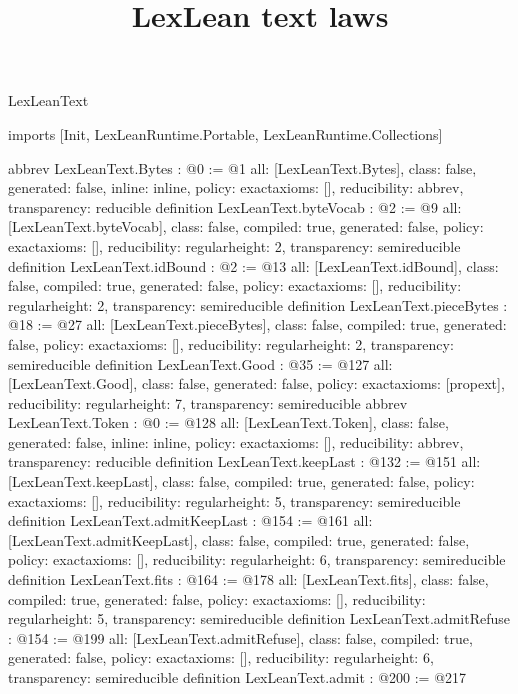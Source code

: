 \begin{lexlean}{LexLeanText}
\title{LexLean text laws}
\begin{coremodule}
imports [Init, LexLeanRuntime.Portable, LexLeanRuntime.Collections]

abbrev LexLeanText.Bytes : @0 := @1 {
  all: [LexLeanText.Bytes],
  class: false,
  generated: false,
  inline: inline,
  policy: exact{axioms: []},
  reducibility: abbrev{},
  transparency: reducible
}
definition LexLeanText.byteVocab : @2 := @9 {
  all: [LexLeanText.byteVocab],
  class: false,
  compiled: true,
  generated: false,
  policy: exact{axioms: []},
  reducibility: regular{height: 2},
  transparency: semireducible
}
definition LexLeanText.idBound : @2 := @13 {
  all: [LexLeanText.idBound],
  class: false,
  compiled: true,
  generated: false,
  policy: exact{axioms: []},
  reducibility: regular{height: 2},
  transparency: semireducible
}
definition LexLeanText.pieceBytes : @18 := @27 {
  all: [LexLeanText.pieceBytes],
  class: false,
  compiled: true,
  generated: false,
  policy: exact{axioms: []},
  reducibility: regular{height: 2},
  transparency: semireducible
}
definition LexLeanText.Good : @35 := @127 {
  all: [LexLeanText.Good],
  class: false,
  generated: false,
  policy: exact{axioms: [propext]},
  reducibility: regular{height: 7},
  transparency: semireducible
}
abbrev LexLeanText.Token : @0 := @128 {
  all: [LexLeanText.Token],
  class: false,
  generated: false,
  inline: inline,
  policy: exact{axioms: []},
  reducibility: abbrev{},
  transparency: reducible
}
definition LexLeanText.keepLast : @132 := @151 {
  all: [LexLeanText.keepLast],
  class: false,
  compiled: true,
  generated: false,
  policy: exact{axioms: []},
  reducibility: regular{height: 5},
  transparency: semireducible
}
definition LexLeanText.admitKeepLast : @154 := @161 {
  all: [LexLeanText.admitKeepLast],
  class: false,
  compiled: true,
  generated: false,
  policy: exact{axioms: []},
  reducibility: regular{height: 6},
  transparency: semireducible
}
definition LexLeanText.fits : @164 := @178 {
  all: [LexLeanText.fits],
  class: false,
  compiled: true,
  generated: false,
  policy: exact{axioms: []},
  reducibility: regular{height: 5},
  transparency: semireducible
}
definition LexLeanText.admitRefuse : @154 := @199 {
  all: [LexLeanText.admitRefuse],
  class: false,
  compiled: true,
  generated: false,
  policy: exact{axioms: []},
  reducibility: regular{height: 6},
  transparency: semireducible
}
definition LexLeanText.admit : @200 := @217 {
}
\end{coremodule}
\end{lexlean}
